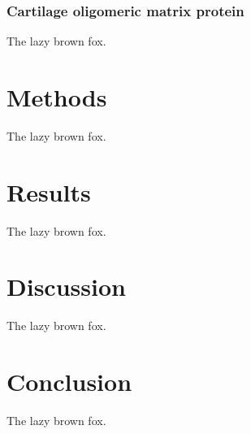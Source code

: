 \subsubsection{Cartilage oligomeric matrix protein}
The lazy brown fox.

\section{Methods}
The lazy brown fox.

\section{Results}
The lazy brown fox.

\section{Discussion}
The lazy brown fox.

\section{Conclusion}
The lazy brown fox.
